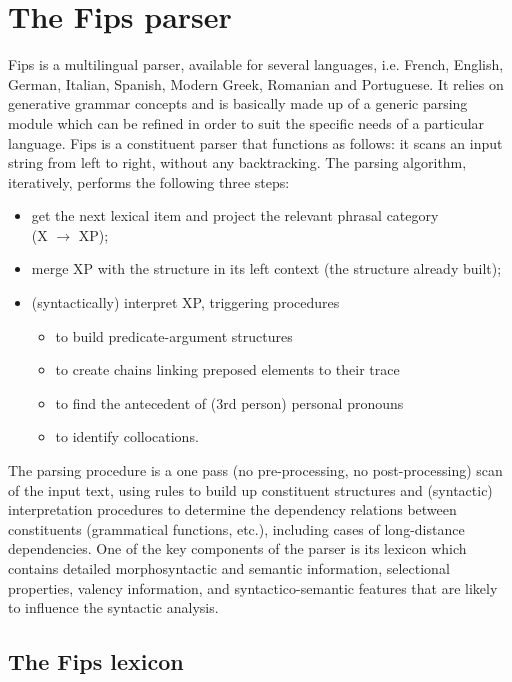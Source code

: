 \documentclass[output=paper]{langsci/langscibook}
\begin{document}
\section{The Fips parser}
\label{sec3}
Fips is a multilingual parser, available for several languages, i.e. French, English, German, Italian, Spanish, Modern Greek, Romanian and Portuguese. It relies on generative grammar concepts and is basically made up of a generic parsing module which can be refined in order to suit the specific needs of a particular language. Fips is a constituent parser that functions as follows: it scans an input string from left to right, without any backtracking. The parsing algorithm, iteratively, performs the following three steps:
\vspace*{3mm}
\renewcommand{\labelitemi}{$\bullet$}
\begin{itemize}
\item get the next lexical item and project the relevant phrasal category\\ (X $\rightarrow$ XP);
\item merge XP with the structure in its left context (the structure already built);
\item (syntactically) interpret XP, triggering procedures 
	\begin{itemize}
		\item to build predicate-argument structures
		\item to create  chains linking preposed elements to their trace
		\item to find the antecedent of (3rd person) personal pronouns
		\item to identify collocations. 
	\end{itemize}
\end{itemize}
 
\vspace*{3mm}
The parsing procedure is a one pass (no pre-processing, no post-processing) scan of the input text, using rules to build up constituent structures and (syntactic) interpretation procedures to determine the dependency relations between constituents (grammatical functions, etc.), including cases of long-distance dependencies.
One of the key components of the parser is its lexicon which contains detailed morphosyntactic and semantic information, selectional properties, valency information, and syntactico-semantic features that are likely to influence the syntactic analysis. 

\subsection{The Fips lexicon}
\end{document}
